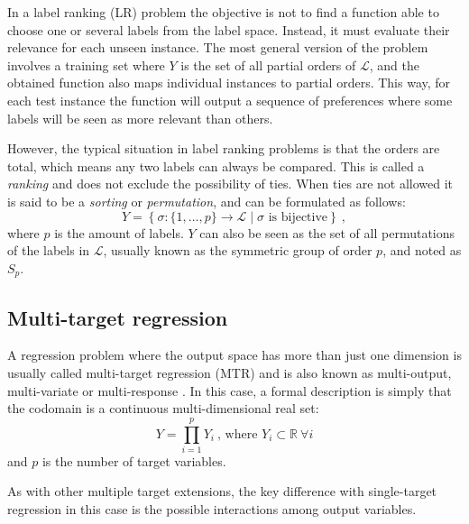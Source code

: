 In a label ranking (LR) problem \cite{lrankpairwise,lranksurvey} the objective is not to find a function able to choose one or several labels from the label space. Instead, it must evaluate their relevance for each unseen instance. The most general version of the problem involves a training set where $Y$ is the set of all partial orders of $\mathcal L$, and the obtained function also maps individual instances to partial orders. This way, for each test instance the function will output a sequence of preferences where some labels will be seen as more relevant than others. 

However, the typical situation in label ranking problems is that the orders are total, which means any two labels can always be compared. This is called a \emph{ranking} and does not exclude the possibility of ties. When ties are not allowed it is said to be a \emph{sorting} or \emph{permutation}, and can be formulated as follows:
\begin{equation}
Y=\left\{\sigma:\{1,\dots,p\}\rightarrow \mathcal L\mid\sigma\mbox{ is bijective}\right\}~,
\end{equation}
where $p$ is the amount of labels. $Y$ can also be seen as the set of all permutations of the labels in $\mathcal L$, usually known as the symmetric group of order $p$, and noted as $S_p$. 

\subsection{Multi-target regression}
\label{p3sec:mtarget}

A regression problem where the output space has more than just one dimension is usually called multi-target regression (MTR) and is also known as multi-output, multi-variate or multi-response \cite{moutr}. In this case, a formal description is simply that the codomain is a continuous multi-dimensional real set:
\begin{equation}
  Y=\prod_{i=1}^p Y_i~\mbox{, where }Y_i\subset\mathbb R~\forall i
  \end{equation}
and $p$ is the number of target variables.
 
As with other multiple target extensions, the key difference with single-target regression in this case is the possible interactions among output variables.

  
